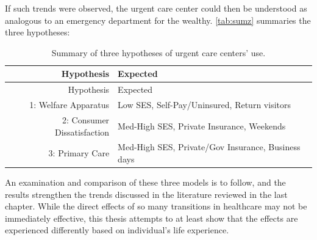 \documentclass[12pt,twoside]{reedthesis}
\begin{document}
  If such trends were observed, the urgent care center could then be
  understood as analogous to an emergency department for the wealthy.
  \autoref{tab:sumz} summaries the three hypotheses:
  
  \begin{longtable}[c]{@{}rl@{}}
  \caption{Summary of three hypotheses of urgent care centers'
  use.}\tabularnewline
  \toprule
  \begin{minipage}[b]{0.32\columnwidth}\raggedleft\strut
  Hypothesis
  \strut\end{minipage} &
  \begin{minipage}[b]{0.62\columnwidth}\raggedright\strut
  Expected
  \strut\end{minipage}\tabularnewline
  \midrule
  \endfirsthead
  \toprule
  \begin{minipage}[b]{0.32\columnwidth}\raggedleft\strut
  Hypothesis
  \strut\end{minipage} &
  \begin{minipage}[b]{0.62\columnwidth}\raggedright\strut
  Expected
  \strut\end{minipage}\tabularnewline
  \midrule
  \endhead
  \begin{minipage}[t]{0.32\columnwidth}\raggedleft\strut
  1: Welfare Apparatus
  \strut\end{minipage} &
  \begin{minipage}[t]{0.62\columnwidth}\raggedright\strut
  Low SES, Self-Pay/Uninsured, Return visitors
  \strut\end{minipage}\tabularnewline
  \begin{minipage}[t]{0.32\columnwidth}\raggedleft\strut
  2: Consumer Dissatisfaction
  \strut\end{minipage} &
  \begin{minipage}[t]{0.62\columnwidth}\raggedright\strut
  Med-High SES, Private Insurance, Weekends
  \strut\end{minipage}\tabularnewline
  \begin{minipage}[t]{0.32\columnwidth}\raggedleft\strut
  3: Primary Care
  \strut\end{minipage} &
  \begin{minipage}[t]{0.62\columnwidth}\raggedright\strut
  Med-High SES, Private/Gov Insurance, Business days
  \strut\end{minipage}\tabularnewline
  \bottomrule
  \end{longtable}
  
  An examination and comparison of these three models is to follow, and
  the results strengthen the trends discussed in the literature reviewed
  in the last chapter. While the direct effects of so many transitions in
  healthcare may not be immediately effective, this thesis attempts to at
  least show that the effects are experienced differently based on
  individual's life experience.
  
\end{document}

